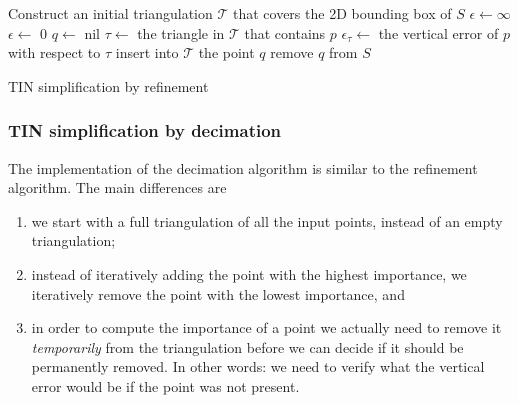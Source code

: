 \begin{algorithm}[tb] 
	Construct an initial triangulation $\mathcal{T}$ that covers the 2D bounding box of $S$ \;
	$\epsilon \leftarrow \infty$ \;
	\While{$\epsilon > \epsilon_{\max}$}
	{
		$\epsilon \leftarrow$ 0 \;
		$q \leftarrow$ nil \;
		{
			$\tau \leftarrow$ the triangle in $\mathcal{T}$ that contains $p$ \;
			$\epsilon_{\tau} \leftarrow$ the vertical error of $p$ with respect to $\tau$ \;
		}
		insert into $\mathcal{T}$ the point $q$ \;
		remove $q$ from $S$ \;
	}
	\caption{TIN simplification by refinement}%
\label{algo:tin-simp:ref}
\end{algorithm}

\subsubsection{TIN simplification by decimation}
The implementation of the decimation algorithm is similar to the refinement algorithm. The main differences are 
\begin{enumerate}
	\item we start with a full triangulation of all the input points, instead of an empty triangulation;
	\item instead of iteratively adding the point with the highest importance, we iteratively remove the point with the lowest importance, and
	\item in order to compute the importance of a point we actually need to remove it \emph{temporarily} from the triangulation before we can decide if it should be permanently removed. In other words: we need to verify what the vertical error would be if the point was not present. 
\end{enumerate}


